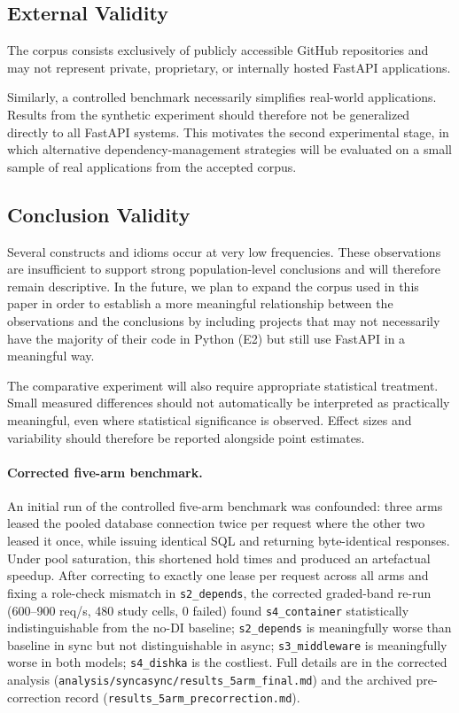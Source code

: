 \subsection{External Validity}

The corpus consists exclusively of publicly accessible GitHub repositories and may not represent private, proprietary, or internally hosted FastAPI applications.

Similarly, a controlled benchmark necessarily simplifies real-world applications. Results from the synthetic experiment should therefore not be generalized directly to all FastAPI systems. This motivates the second experimental stage, in which alternative dependency-management strategies will be evaluated on a small sample of real applications from the accepted corpus.

\subsection{Conclusion Validity}

Several constructs and idioms occur at very low frequencies. These observations are insufficient to support strong population-level conclusions and will therefore remain descriptive. In the future, we plan to expand the corpus used in this paper in order to establish a more meaningful relationship between the observations and the conclusions by including projects that may not necessarily have the majority of their code in Python (E2) but still use FastAPI in a meaningful way.

The comparative experiment will also require appropriate statistical treatment. Small measured differences should not automatically be interpreted as practically meaningful, even where statistical significance is observed. Effect sizes and variability should therefore be reported alongside point estimates.

\paragraph{Corrected five-arm benchmark.} An initial run of the controlled five-arm benchmark was confounded: three arms leased the pooled database connection twice per request where the other two leased it once, while issuing identical SQL and returning byte-identical responses. Under pool saturation, this shortened hold times and produced an artefactual speedup. After correcting to exactly one lease per request across all arms and fixing a role-check mismatch in \texttt{s2\_depends}, the corrected graded-band re-run (600--900 req/s, 480 study cells, 0 failed) found \texttt{s4\_container} statistically indistinguishable from the no-DI baseline; \texttt{s2\_depends} is meaningfully worse than baseline in sync but not distinguishable in async; \texttt{s3\_middleware} is meaningfully worse in both models; \texttt{s4\_dishka} is the costliest. Full details are in the corrected analysis (\texttt{analysis/syncasync/results_5arm_final.md}) and the archived pre-correction record (\texttt{results\_5arm\_precorrection.md}).
